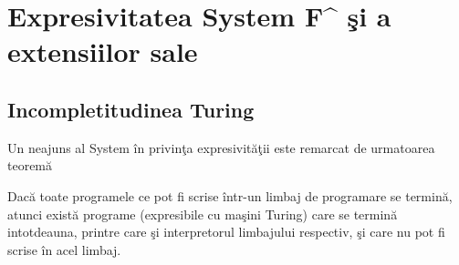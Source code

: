 \chapter{Expresivitatea System F\^{} \c si a extensiilor sale}
\label{Capitolul5}

\section{Incompletitudinea Turing}

Un neajuns al System \fhat \^ in privin\c ta expresivit\u a\c tii este remarcat de urmatoarea teorem\u a \citep{citeulike:4023285}

\begin{theorem}\label{turing_incomplete}
Dac\u a toate programele ce pot fi scrise \^ intr-un limbaj de programare se termin\u a, atunci exist\u a programe (expresibile cu ma\c sini Turing) care se termin\u a intotdeauna, printre care \c si interpretorul limbajului respectiv, \c si care nu pot fi scrise \^ in acel limbaj.
\end{theorem}

